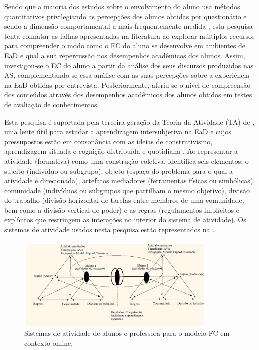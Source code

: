 \documentclass[portuguese]{textolivre}
\begin{document}
Sendo que a maioria dos estudos sobre o envolvimento do aluno usa métodos quantitativos \cite{bond_facilitating_2020} privilegiando as percepções dos alunos obtidas por questionário \cite{xu_effects_2020} e sendo a dimensão comportamental a mais frequentemente medida \cite{henrie_measuring_2015}, esta pesquisa tenta colmatar as falhas apresentadas na literatura ao explorar múltiplos recursos para compreender o modo como o EC do aluno se desenvolve em ambientes de EaD e qual a sua repercussão nos desempenhos acadêmicos dos alunos. Assim, investigou-se o EC do aluno a partir da análise dos seus discursos produzidos nas AS, complementando-se essa análise com as suas percepções sobre a experiência na EaD obtidas por entrevista. Posteriormente, aferiu-se o nível de compreensão dos conteúdos através dos desempenhos acadêmicos dos alunos obtidos em testes de avaliação de conhecimentos.

Esta pesquisa é suportada pela terceira geração da Teoria da Atividade (TA) de \textcite{engestrom_expansive_2001}, uma lente útil para estudar a aprendizagem intersubjetiva na EaD e cujos pressupostos estão em consonância com as ideias de construtivismo, aprendizagem situada e cognição distribuída e quotidiana \cite{bower_quantitative_2010}. Ao representar a atividade (formativa) como uma construção coletiva, \textcite{engestrom_expansive_2001} identifica seis elementos: o sujeito (indivíduo ou subgrupo), objeto (espaço do problema para o qual a atividade é direcionada), artefatos mediadores (ferramentas físicas ou simbólicas), comunidade (indivíduos ou subgrupos que partilham o mesmo objetivo), divisão do trabalho (divisão horizontal de tarefas entre membros de uma comunidade, bem como a divisão vertical de poder) e as regras (regulamentos implícitos e explícitos que restringem as interações no interior do sistema de atividade). Os sistemas de atividade usados nesta pesquisa estão representados na .

\begin{figure}[htbp]
 \centering
 \includegraphics[width=0.85\textwidth]{fig1.png}
 \caption{Sistemas de atividade de alunos e professora para o modelo FC em contexto online.}
 \label{fig01}
\end{figure}
\end{document}
